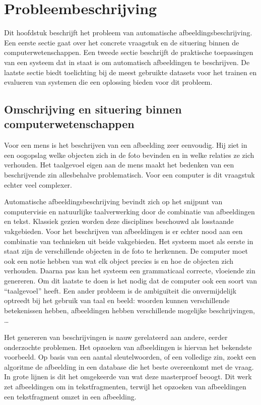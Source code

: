 \chapter{Probleembeschrijving}
\label{chap:Probleembeschrijving}
Dit hoofdstuk beschrijft het probleem van automatische afbeeldingsbeschrijving. Een eerste sectie gaat over het concrete vraagstuk en de situering binnen de computerwetenschappen. Een tweede sectie beschrijft de praktische toepassingen van een systeem dat in staat is om automatisch afbeeldingen te beschrijven. De laatste sectie biedt toelichting bij de meest gebruikte datasets voor het trainen en evalueren van systemen die een oplossing bieden voor dit probleem.

\section{Omschrijving en situering binnen computerwetenschappen}
\label{sec:Omschrijving en situering}
Voor een mens is het beschrijven van een afbeelding zeer eenvoudig. Hij ziet in een oogopslag welke objecten zich in de foto bevinden en in welke relaties ze zich verhouden. Het taalgevoel eigen aan de mens maakt het bedenken van een beschrijvende zin allesbehalve problematisch.
Voor een computer is dit vraagstuk echter veel complexer.

Automatische afbeeldingsbeschrijving bevindt zich op het snijpunt van computervisie en natuurlijke taalverwerking door de combinatie van afbeeldingen en tekst. Klassiek gezien worden deze disciplines beschouwd als losstaande vakgebieden. Voor het beschrijven van afbeeldingen is er echter nood aan een combinatie van technieken uit beide vakgebieden. Het systeem moet als eerste in staat zijn de verschillende objecten in de foto te herkennen. De computer moet ook een notie hebben van wat elk object precies is en hoe de objecten zich verhouden. Daarna pas kan het systeem een grammaticaal correcte, vloeiende zin genereren. Om dit laatste te doen is het nodig dat de computer ook een soort van ``taalgevoel'' heeft. Een ander probleem is de ambigu\"iteit die onvermijdelijk optreedt bij het gebruik van taal en beeld: woorden kunnen verschillende betekenissen hebben, afbeeldingen hebben verschillende mogelijke beschrijvingen, \ldots

Het genereren van beschrijvingen is nauw gerelateerd aan andere, eerder onderzochte problemen. Het opzoeken van afbeeldingen is hiervan het bekendste voorbeeld. Op basis van een aantal sleutelwoorden, of een volledige zin, zoekt een algoritme de afbeelding in een database die het beste overeenkomt met de vraag. In grote lijnen is dit het omgekeerde van wat deze masterproef beoogt. Dit werk zet afbeeldingen om in tekstfragmenten, terwijl het opzoeken van afbeeldingen een tekstfragment omzet in een afbeelding.

